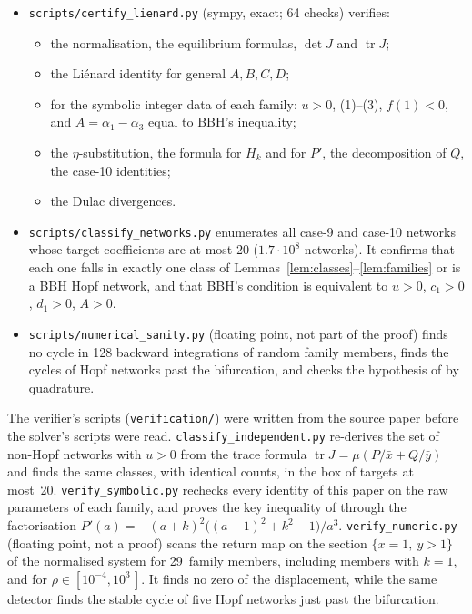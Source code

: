 \documentclass[11pt,a4paper]{report}
\newcommand{\Trop}{\operatorname{tr}}
\begin{document}
\begin{itemize}
\item \texttt{scripts/certify\_lienard.py} (sympy, exact; 64 checks) verifies:
  \begin{itemize}
  \item the normalisation, the equilibrium formulas, \(\det J\) and \(\Trop J\);
  \item the Li\'enard identity for general \(A,B,C,D\);
  \item for the symbolic integer data of each family: \(u>0\), (1)--(3), \(f(1)<0\), and
    \(A=\alpha_1-\alpha_3\) equal to BBH's inequality;
  \item the \(\eta\)-substitution, the formula for \(H_k\) and for \(P'\), the decomposition of \(Q\), the
    case-10 identities;
  \item the Dulac divergences.
  \end{itemize}
\item \texttt{scripts/classify\_networks.py} enumerates all case-9 and case-10 networks whose target coefficients are
  at most 20 (\(1.7\cdot10^8\) networks). It confirms that each one falls in exactly one class of
  Lemmas~\ref{lem:classes}--\ref{lem:families} or is a BBH Hopf network, and that BBH's condition is equivalent to
  \(u>0\), \(c_1>0\), \(d_1>0\), \(A>0\).
\item \texttt{scripts/numerical\_sanity.py} (floating point, not part of the proof) finds no cycle in 128 backward
  integrations of random family members, finds the cycles of Hopf networks past the bifurcation, and checks the
  hypothesis of  by quadrature.
\end{itemize}
The verifier's scripts (\texttt{verification/}) were written from the source paper before the solver's
scripts were read. \texttt{classify\_independent.py} re-derives the set of non-Hopf networks with \(u>0\) from the
trace formula \(\Trop J=\mu(P/\bar x+Q/\bar y)\) and finds the same classes, with identical counts, in the box of
targets at most~20. \texttt{verify\_symbolic.py} rechecks every identity of this paper on the raw parameters of each
family, and proves the key inequality of  through the factorisation
\(P'(a)=-(a+k)^2\bigl((a-1)^2+k^2-1\bigr)/a^3\). \texttt{verify\_numeric.py} (floating point, not a proof) scans the
return map on the section \(\{x=1,\ y>1\}\) of the normalised system for 29~family members, including
members with \(k=1\), and for \(\rho\in[10^{-4},10^3\,]\). It finds no zero of the displacement, while the same detector
finds the stable cycle of five Hopf networks just past the bifurcation.

\paperreferences
\end{document}

